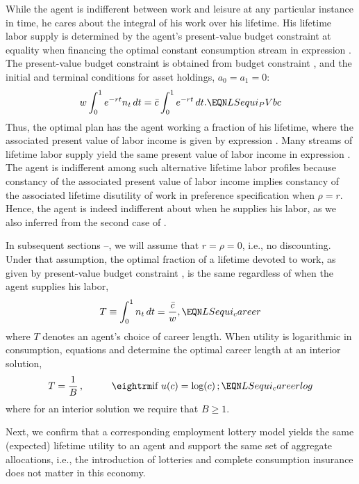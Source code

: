 While the agent is indifferent between work and leisure at any
particular instance in time,  he   cares about the integral of his work over his lifetime.  His lifetime labor
supply is determined by the agent's present-value budget constraint
at equality when financing the optimal constant consumption
stream in expression . The present-value budget
constraint is obtained from budget constraint ,
and the initial and terminal conditions for asset holdings,
$a_0=a_1=0$:
$$
w \int_0^1 e^{-rt} n_t\, dt = \bar c \int_0^1 e^{-rt} \, dt.
\EQN LSequi_PVbc
$$
Thus, the optimal plan has the agent working a fraction of
his lifetime, where the associated present value of labor income
is given by expression . Many  streams of lifetime labor supply
 yield the same present value of labor income in expression
. The agent is indifferent among
such alternative lifetime labor profiles because constancy of
the associated present value of labor income implies constancy
of the associated lifetime disutility of work in preference
specification  when $\rho=r$. Hence, the
agent is indeed indifferent about when he supplies his labor, as we
also inferred from the second case of .

In subsequent sections --,
we will assume that $r=\rho=0$, i.e., no discounting.
Under that assumption, the optimal fraction of a lifetime devoted to
work, as given by present-value budget constraint ,
is the same regardless of when the agent supplies his labor,
$$
T \equiv \int_0^1 n_t\, dt = {\bar c \over w},        \EQN LSequi_career
$$
where $T$ denotes an agent's choice of career length. When
utility is logarithmic in consumption, equations
 and  determine the
optimal career length at an interior solution,
$$
T ={1 \over B}\,,  \hskip1cm \hbox{\rm if   } u(c)=\log (c)\,;
                                                   \EQN LSequi_careerlog
$$
where  for an interior
solution we require  that $B \geq 1$.

Next, we confirm that a corresponding employment lottery model
yields the same (expected) lifetime utility to an agent and support
the same set of aggregate allocations, i.e., the introduction of
lotteries and complete consumption insurance does not matter in
this economy.



